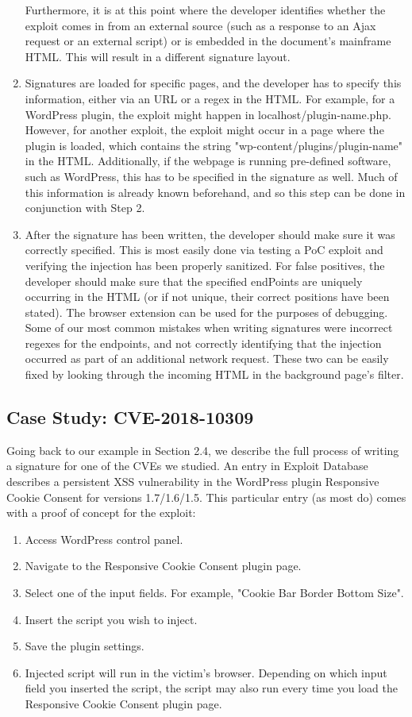 \begin{enumerate}
Furthermore, it is at this point where the developer identifies whether the exploit comes in from an external source (such as a response to an Ajax request or an external script) or is embedded in the document's mainframe HTML. This will result in a different signature layout. 
\item
Signatures are loaded for specific pages, and the developer has to specify this information, either via an URL or a regex in the HTML. For example, for a WordPress plugin, the exploit might happen in localhost/plugin-name.php. However, for another exploit, the exploit might occur in a page where the plugin is loaded, which contains the string "wp-content/plugins/plugin-name" in the HTML. Additionally, if the webpage is running pre-defined software, such as WordPress, this has to be specified in the signature as well. Much of this information is already known beforehand, and so this step can be done in conjunction with Step 2.
\item
After the signature has been written, the developer should make sure it was correctly specified. This is most easily done via testing a PoC exploit and verifying the injection has been properly sanitized. For false positives, the developer should make sure that the specified endPoints are uniquely occurring in the HTML (or if not unique, their correct positions have been stated). The browser extension can be used for the purposes of debugging. Some of our most common mistakes when writing signatures were incorrect regexes for the endpoints, and not correctly identifying that the injection occurred as part of an additional network request. These two can be easily fixed by looking through the incoming HTML in the background page's filter. 
\end{enumerate}

\subsection{Case Study: CVE-2018-10309}
Going back to our example in Section 2.4, we describe the full process of writing a signature for one of the CVEs we studied. An entry in Exploit Database \cite{studyCVE} describes a persistent \ac{XSS} vulnerability in the WordPress plugin Responsive Cookie Consent for versions 1.7/1.6/1.5. This particular entry (as most do) comes with a proof of concept for the exploit: 
\begin{enumerate}
\item Access WordPress control panel.
\item Navigate to the Responsive Cookie Consent plugin page.
\item Select one of the input fields. For example, "Cookie Bar Border Bottom Size".
\item Insert the script you wish to inject.
\item Save the plugin settings.
\item Injected script will run in the victim's browser. Depending on which input field you inserted the script, the script may also run every time you load the Responsive Cookie Consent plugin page.
	
\end{enumerate}


